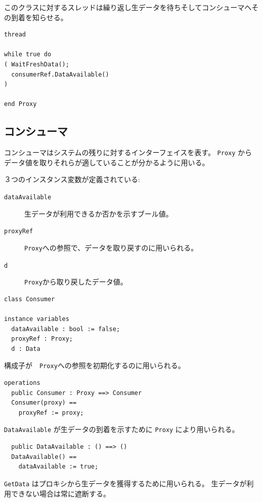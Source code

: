 \documentclass[\pformat,12pt]{jreport}
\begin{document}
このクラスに対するスレッドは繰り返し生データを待ちそしてコンシューマへその到着を知らせる。

\begin{lstlisting}
thread

while true do
( WaitFreshData();
  consumerRef.DataAvailable()
)

end Proxy
\end{lstlisting}

\subsection{コンシューマ}

コンシューマはシステムの残りに対するインターフェイスを表す。
 \texttt{Proxy} からデータ値を取りそれらが適していることが分かるように用いる。

３つのインスタンス変数が定義されている:

\begin{description}
\item[\texttt{dataAvailable}] 生データが利用できるか否かを示すブール値。
\item[\texttt{proxyRef}]  \texttt{Proxy}への参照で、データを取り戻すのに用いられる。
\item[\texttt{d}]  \texttt{Proxy}から取り戻したデータ値。
\end{description}

\begin{lstlisting}
class Consumer

instance variables
  dataAvailable : bool := false;
  proxyRef : Proxy;
  d : Data
\end{lstlisting}

構成子が　\texttt{Proxy}への参照を初期化するのに用いられる。

\begin{lstlisting}
operations
  public Consumer : Proxy ==> Consumer
  Consumer(proxy) ==
    proxyRef := proxy;
\end{lstlisting}

\texttt{DataAvailable} が生データの到着を示すために \texttt{Proxy} により用いられる。

\begin{lstlisting}
  public DataAvailable : () ==> ()
  DataAvailable() ==
    dataAvailable := true;
\end{lstlisting}

\texttt{GetData} はプロキシから生データを獲得するために用いられる。
生データが利用できない場合は常に遮断する。
\end{document}
